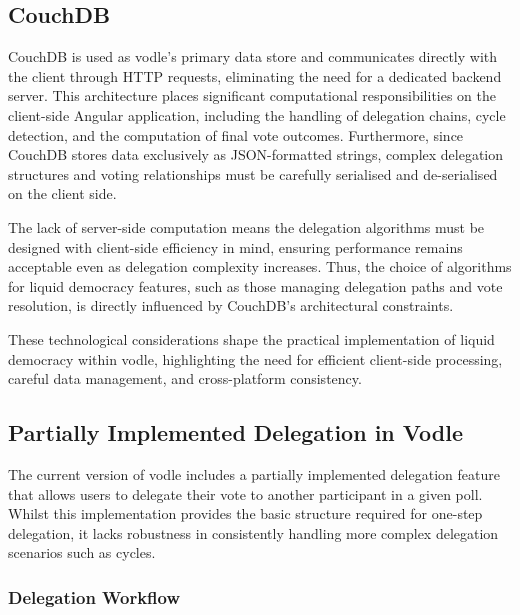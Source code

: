 \subsection*{CouchDB}
CouchDB \citep{couchdb} is used as vodle's primary data store and communicates directly with the client through HTTP requests, eliminating the need for a dedicated backend server. This architecture places significant computational responsibilities on the client-side Angular application, including the handling of delegation chains, cycle detection, and the computation of final vote outcomes. Furthermore, since CouchDB stores data exclusively as JSON-formatted strings, complex delegation structures and voting relationships must be carefully serialised and de-serialised on the client side.

The lack of server-side computation means the delegation algorithms must be designed with client-side efficiency in mind, ensuring performance remains acceptable even as delegation complexity increases. Thus, the choice of algorithms for liquid democracy features, such as those managing delegation paths and vote resolution, is directly influenced by CouchDB's architectural constraints.

These technological considerations shape the practical implementation of liquid democracy within vodle, highlighting the need for efficient client-side processing, careful data management, and cross-platform consistency.

\subsection{Partially Implemented Delegation in Vodle}

The current version of vodle includes a partially implemented delegation feature that allows users to delegate their vote to another participant in a given poll. Whilst this implementation provides the basic structure required for one-step delegation, it lacks robustness in consistently handling more complex delegation scenarios such as cycles.

\subsubsection*{Delegation Workflow}

